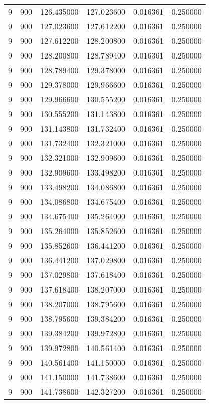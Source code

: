 \begin{longtable}{rrrrrr}
9 & 900 & 126.435000 & 127.023600 & 0.016361 & 0.250000 \\
9 & 900 & 127.023600 & 127.612200 & 0.016361 & 0.250000 \\
9 & 900 & 127.612200 & 128.200800 & 0.016361 & 0.250000 \\
9 & 900 & 128.200800 & 128.789400 & 0.016361 & 0.250000 \\
9 & 900 & 128.789400 & 129.378000 & 0.016361 & 0.250000 \\
9 & 900 & 129.378000 & 129.966600 & 0.016361 & 0.250000 \\
9 & 900 & 129.966600 & 130.555200 & 0.016361 & 0.250000 \\
9 & 900 & 130.555200 & 131.143800 & 0.016361 & 0.250000 \\
9 & 900 & 131.143800 & 131.732400 & 0.016361 & 0.250000 \\
9 & 900 & 131.732400 & 132.321000 & 0.016361 & 0.250000 \\
9 & 900 & 132.321000 & 132.909600 & 0.016361 & 0.250000 \\
9 & 900 & 132.909600 & 133.498200 & 0.016361 & 0.250000 \\
9 & 900 & 133.498200 & 134.086800 & 0.016361 & 0.250000 \\
9 & 900 & 134.086800 & 134.675400 & 0.016361 & 0.250000 \\
9 & 900 & 134.675400 & 135.264000 & 0.016361 & 0.250000 \\
9 & 900 & 135.264000 & 135.852600 & 0.016361 & 0.250000 \\
9 & 900 & 135.852600 & 136.441200 & 0.016361 & 0.250000 \\
9 & 900 & 136.441200 & 137.029800 & 0.016361 & 0.250000 \\
9 & 900 & 137.029800 & 137.618400 & 0.016361 & 0.250000 \\
9 & 900 & 137.618400 & 138.207000 & 0.016361 & 0.250000 \\
9 & 900 & 138.207000 & 138.795600 & 0.016361 & 0.250000 \\
9 & 900 & 138.795600 & 139.384200 & 0.016361 & 0.250000 \\
9 & 900 & 139.384200 & 139.972800 & 0.016361 & 0.250000 \\
9 & 900 & 139.972800 & 140.561400 & 0.016361 & 0.250000 \\
9 & 900 & 140.561400 & 141.150000 & 0.016361 & 0.250000 \\
9 & 900 & 141.150000 & 141.738600 & 0.016361 & 0.250000 \\
9 & 900 & 141.738600 & 142.327200 & 0.016361 & 0.250000 \\

\end{longtable}
